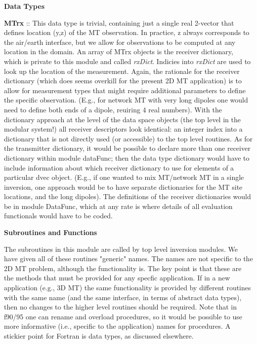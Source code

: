 \documentclass[12pt]{article}
\begin{document}
\vspace{10pt}

\noindent
{\bf Data Types}

\vspace{6pt}

{\bf MTrx} :: This data type is trivial, containing just a single real 2-vector
that defines location (y,z) of the MT observation.  In practice,
z always corresponds to the air/earth interface, but we allow
for observations to be computed at any location in the domain.
An array of MTrx objects is the receiver dictionary, which is
private to this module and called
{\it rxDict}.  Indicies into {\it rxDict}
are used to look up the location of the measurement.  Again,
the rationale for the receiver dictionary (which does seems overkill
for the present 2D MT application) is to allow for measurement types
that might require additional parameters to define the specific observation.
(E.g., for network MT with very long dipoles one would 
need to define both ends of a dipole, reuiring 4 real numbers).  
With the dictionary approach at the level
of the data space objects (the top level in the modular system!)
all receiver descriptors look identical: an integer index into
a dictionary that is not directly used (or accessible) to the top
level routines.  As for the transmitter dictionary, it
would be possible to declare more than one receiver dictionary
within module dataFunc; then the data type dictionary would have
to include information about which receiver dictionary to use
for elements of a particular dvec object.  (E.g., if one wanted
to mix MT/network MT in a single inversion, one approach would
be to have separate dictionaries for the MT site locations, and
the long dipoles).  The definitions of the receiver dictionaries
would be in module DataFunc, which at any rate is where details
of all evaluation functionals would have to be coded.

\vspace{10pt}

\noindent
{\bf Subroutines and Functions}

\vspace{6pt}

The subroutines in this module are called by top level inversion
modules.  We have given all of these routines "generic" names.
The names are not specific to the 2D MT problem, although
the functionality is.  The key point is that these are the
methods that must be provided for any specfic application.
If in a new application (e.g., 3D MT) the same functionality
is provided by different routines with the same name (and
the same interface, in terms of abstract data types), then
no changes to the higher level routines should be required.
Note that in f90/95 one can rename and overload procedures, so it would
be possible to use more informative (i.e., specific to the application)
names for procedures.  A stickier point for Fortran
is data types, as discussed elsewhere.
\end{document}
